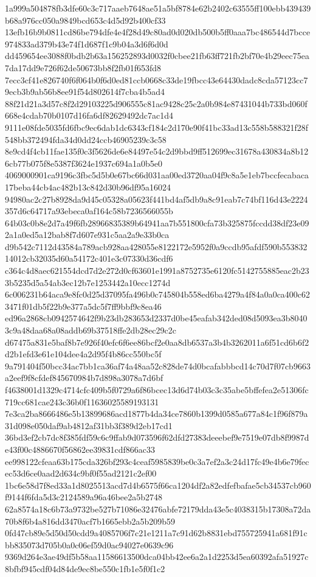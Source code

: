 \documentclass[11pt,a4paper]{article}
\begin{document}
{1a999a504878fb3dfe60c3c717aaeb7648ae51a5bf8784e62b2402c63555ff100ebb439439b68a976cc050a9849bcd653c4d5d92b400cf33
13efb16b9b0811cd86be794dfe4e4f28d49c80ad0d020db500b5ff0aaa7bc486544d7bcce974833ad379b43e74f1d687f1c9b04a3d6f6d0d
dd459654ee3088f0bdb2b63a156252893d0032f0cbee21fb63ff721fb2bf70e4b29eec75ea7da17dd9e726f62de50673bb8f2fb01f653fd8
7ecc3cf41e826740f6f064b0f6d0ed81ccb0668c33de19fbcc43e64430dadc8cda57123cc79ecb3b9ab56b8ee91f54d802614f7cba4b5ad4
88f21d21a3d57c8f2d29103225d906555c81ac9428c25c2a0b984e87431044b733bd060f668e4cdab70b0107d16fa6df82629492dc7ac1d4
9111e08fde5035fd6fbc9ec6dab1dc6343cf184c2d170e90f41bc33ad13c558b588321f28f548bb372494fda34d0dd24ccb46905239c3c58
8e9cd4f4cb11fae135f0c3f5626de6e84497e54c2d9bbd9ff512699ec31678a430834a8b126cb77b075f8e5387f3624e1937c694a1a0b5e0
4069000901ca9196c3fbc5d5b0e67bc66d031aa00ed3720aa04f9c8a5e1eb7bccfecabaca17beba44cb4ac482b13c842d30b96df95a16024
94980ac2c27b8928da9d45c05328a05623f441bd4af5db9a8c91eab7c74bf116d43e2224357d6c64717a93ebeca0af164c58b7236566055b
64b03c0b8e2d7a49f6fb28966835389b64941aa7b551800cfa73b325875fccdd38df23e092a1a0ed5a12bab8f7d607e931c5aa2a9e33b0ca
d9b542c7112d43584a789acb928aa428055e8122172e5952f0a9ccdb95afdf590b55383214012cb32035d60a54172c401e3c07330d36cdf6
c364c4d8aec621554dcd7d2e272d0cf63601e1991a8752735e6120fc5142755885eac2b233b5235d5a54ab3ec12b7e1253442a10ecc1274d
6c006231b64aca9e8fc0d25d37095fa496b0c745804b558ed6ba4279a4f84a0a0ca400c623471f01db5f22b9e377a5dc5f7ff9bbf9c8ea46
ed96a2868cb0942574642f9b23db283653d2337d0be45eafab342ded08d5093ea3b80403c9a48daa68a08addb69b37518ffe2db28ec29c2c
d67475a831e5baf8b7e926f40efc6f6ee86bcf2e0aa8db6537a3b4b3262011a6f51cd6b6f2d2b1efd3e61e104dee4a2d95f4b86cc550bc5f
9a791404f50bcc34ac7bb1ca36af74a48aa52c828de74d0bcafabbbcd14c70d7f07cb9663a2eef9f8cfdef845670984b7d898a3078a7d6bf
f4638001d1329c4714cfc409b5f0729a6f86bcec13d6d74b03c3c35abe5bffefea2e51306fc719cc681cae243c36b0f11636025589193131
7e3ca2ba8666486e5b13899686acd1877b4da34ce7860b1399d0585a677a84c1f96f879a31d098e050daf9ab4812af31bb3f389d2eb17cd1
36bd3ef2cb7dc8f385fdf59c6c9ffab9d073596f62dfd27383deeebef9e7519e07db8f9987de43f00c4886670f56862ee39831cdf866ac33
ee998122cfeaa63b175cda326bf293c4ceaf5985839be0c3a7ef2a3c24d17fc49e4b6e79fecec53d6ce0aad2d634c9bf0f55ad2121c2ef00
1bc6e58d7f8ed33a1d8025513acd7d4b6575f66ca1204df2a82edfefbafae5cb34537cb960f9144f6fda5d3c2124589a96a46bee2a5b2748
62a8574a18c6b73a9732be527b71086e32476abfe72179dda43e5c4038315b17308a72da70b8f6b4a816dd3470acf7b1665ebb2a5b209b59
0fd47cb89e5d50d50cdd9a4085706f7c21e1211a7c91d62b8831ebd755725941a681f91cbb835073d705b0a0c06ef59d0ac94027e0639c96
9369d264e3ae49df5b58aa11586613500dca04bb42ee6a2a1d2253d5ea60392afa51927c8bfbf945cdf04d84de9ec8be550c1fb1e5f0f1c2
}
\end{document}

